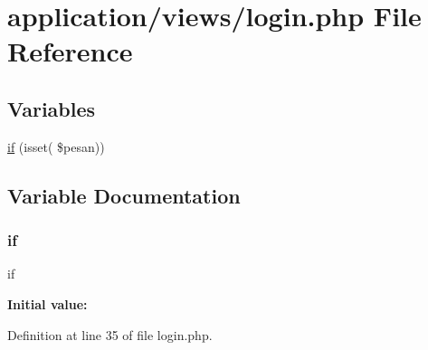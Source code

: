 \hypertarget{login_8php}{}\section{application/views/login.php File Reference}
\label{login_8php}
\subsection*{Variables}
\begin{DoxyCompactItemize}
\item 
\mbox{\hyperlink{login_8php_a8a924f7bbdc730972402d95622cbe343}{if}} (isset( \$pesan))
\end{DoxyCompactItemize}


\subsection{Variable Documentation}
\mbox{\label{login_8php_a8a924f7bbdc730972402d95622cbe343}} 
\subsubsection{\texorpdfstring{if}{if}}
{\footnotesize\ttfamily if}

{\bfseries Initial value\+:}
\begin{DoxyCode}{0}
\DoxyCodeLine{\{}

\end{DoxyCode}


Definition at line 35 of file login.\+php.

